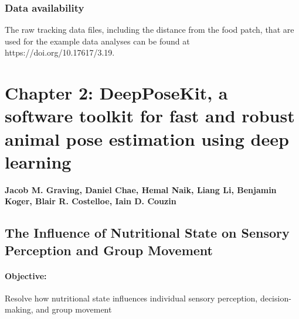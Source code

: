 \documentclass[11pt,a4paper,oneside]{article}
\begin{document}
\subsubsection{Data availability}
The raw tracking data files, including the distance from the food patch, that are used for the example data analyses can be found at https://doi.org/10.17617/3.19.




\newpage 
	\section[Chapter 2: DeepPoseKit, a software toolkit for animal pose estimation]{\centering Chapter 2: DeepPoseKit, a software toolkit for fast and robust animal pose estimation using deep learning}
	
	\textbf{Jacob M. Graving, Daniel Chae, Hemal Naik, Liang Li, Benjamin Koger, Blair R. Costelloe, Iain D. Couzin}


\subsection[Nutritional State and Sensory Perception]{The Influence of Nutritional State on Sensory Perception and Group Movement} \label{project2}
\paragraph{Objective:} 
Resolve how nutritional state influences individual sensory perception, decision-making, and group movement
\end{document}
